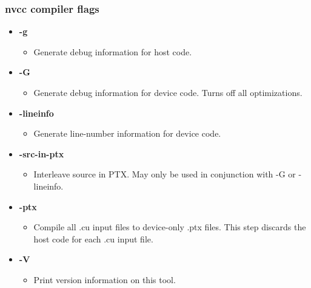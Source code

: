 \documentclass[aspectratio=169,handout]{beamer}
\begin{document}
\begin{frame}[fragile]
\frametitle{nvcc compiler flags}

\begin{itemize}
	
	\item[] \textbf{-g}
	\begin{itemize}
		\item[] Generate debug information for host code.
	\end{itemize}
	
		\item[] \textbf{-G}
	\begin{itemize}
		\item[] Generate debug information for device code. Turns off all optimizations. 
	\end{itemize}

	\item[] \textbf{-lineinfo}
\begin{itemize}
	\item[] Generate line-number information for device code.
\end{itemize}

\item[] \textbf{-src-in-ptx}
\begin{itemize}
	\item[] Interleave source in PTX. May only be used in conjunction with -G or -lineinfo. 
\end{itemize}

	\item[] \textbf{-ptx}
\begin{itemize}
	\item[] Compile all .cu input files to device-only .ptx files. This step discards the host code for each .cu input file. 
\end{itemize}

	\item[] \textbf{-V}
\begin{itemize}
	\item[]  	Print version information on this tool.
\end{itemize}

\end{itemize}
\end{frame}
\end{document}
